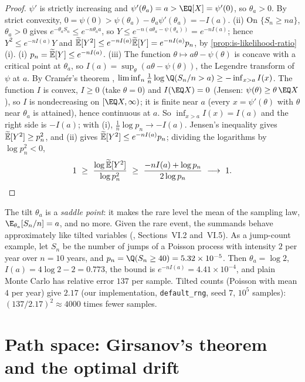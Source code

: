 \begin{proof}
$\psi'$ is strictly increasing and $\psi'(\theta_a)=a>\EQ[X]=\psi'(0)$, so $\theta_a>0$. By
strict convexity, $0=\psi(0)>\psi(\theta_a)-\theta_a\psi'(\theta_a)=-I(a)$.
(ii) On $\{S_n\ge na\}$, $\theta_a>0$ gives $e^{-\theta_aS_n}\le e^{-n\theta_aa}$, so
$Y\le e^{-n(a\theta_a-\psi(\theta_a))}=e^{-nI(a)}$; hence $Y^2\le e^{-nI(a)}Y$ and
$\widetilde{\mathbb E}[Y^2]\le e^{-nI(a)}\widetilde{\mathbb E}[Y]=e^{-nI(a)}p_n$, by \cref{prop:is-likelihood-ratio}(i).
(i) $p_n=\widetilde{\mathbb E}[Y]\le e^{-nI(a)}$.
(iii) The function $\theta\mapsto a\theta-\psi(\theta)$ is concave with a critical point at
$\theta_a$, so $I(a)=\sup_\theta(a\theta-\psi(\theta))$, the Legendre transform of $\psi$ at
$a$. By Cramér's theorem \citep[Theorem~2.2.3]{dembo-zeitouni},
$\liminf_n\frac1n\log\Q(S_n/n>a)\ge-\inf_{x>a}I(x)$. The function $I$ is convex, $I\ge0$ (take $\theta=0$) and
$I(\EQ X)=0$ (Jensen: $\psi(\theta)\ge\theta\,\EQ X$), so $I$ is nondecreasing on
$[\EQ X,\infty)$; it is finite near $a$ (every $x=\psi'(\theta)$ with $\theta$ near $\theta_a$
is attained), hence continuous at $a$. So $\inf_{x>a}I(x)=I(a)$ and the right side is $-I(a)$; with (i), $\frac1n\log p_n\to-I(a)$. Jensen's inequality
gives $\widetilde{\mathbb E}[Y^2]\ge p_n^2$, and (ii) gives $\widetilde{\mathbb E}[Y^2]\le e^{-nI(a)}p_n$; dividing the logarithms
by $\log p_n^2<0$,
\[
  1\ \ge\ \frac{\log\Et[Y^2]}{\log p_n^2}\ \ge\ \frac{-nI(a)+\log p_n}{2\log p_n}\ \longrightarrow\ 1 .\qedhere
\]
\end{proof}

The tilt $\theta_a$ is a \emph{saddle point}: it makes the rare level the mean of the
sampling law, $\E_{\theta_a}[S_n/n]=a$, and no more. Given the rare event, the summands behave approximately like tilted
variables (\citealp{asmussen-glynn}, Sections~VI.2 and~VI.5). As a jump-count example, let $S_n$ be the
number of jumps of a Poisson process with intensity $2$ per year over $n=10$ years, and
$p_n=\Q(S_n\ge40)=5.32\times10^{-5}$. Then $\theta_a=\log2$, $I(a)=4\log2-2=0.773$, the bound
is $e^{-nI(a)}=4.41\times10^{-4}$, and plain Monte Carlo has relative error $137$ per sample.
Tilted counts (Poisson with mean $4$ per year) give $2.17$ (our implementation,
\texttt{default\_rng}, seed $7$, $10^5$ samples): $(137/2.17)^2\approx4000$ times fewer samples.

\section{Path space: Girsanov's theorem and the optimal drift}\label{sec:is-path}

